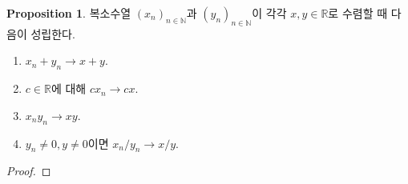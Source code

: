 \documentclass[11pt]{book}
\numberwithin{equation}{chapter}
\def\NN{\mathbb{N}}
\def\RR{\mathbb{R}}
\theoremstyle{definition}
\newtheorem{prop}[thm]{Proposition}
\begin{document}
    \begin{prop}
        복소수열 \((x_n)_{n \in \NN}\)과 \((y_n)_{n \in \NN}\)이 각각 \(x, y \in \RR\)로 수렴할 때 다음이 성립한다.
        \begin{enumerate} [label=(\alph*), leftmargin=2\parindent]
            \item
            \(x_n + y_n \to x + y\).
            \item
            \(c \in \RR\)에 대해 \(cx_n \to cx\).
            \item
            \(x_ny_n \to xy\).
            \item
            \(y_n \ne 0, y \ne 0\)이면 \(x_n/y_n \to x/y\).
        \end{enumerate}
    \end{prop}
    \begin{proof}
        \quad


\end{proof}
\end{document}
